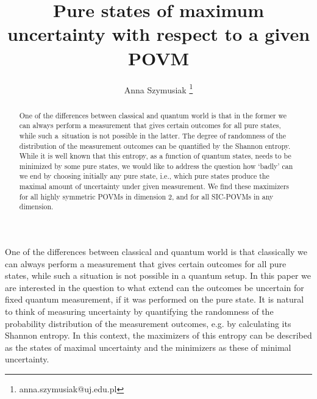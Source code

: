 \documentclass[11pt]{article}
\theoremstyle{remark}
\theoremstyle{definition}
\begin{document}
\title{Pure states of maximum uncertainty with respect to a given POVM}
\author[1]{Anna Szymusiak \thanks{anna.szymusiak@uj.edu.pl}}
\date{}

\maketitle
\begin{abstract}
One of the differences between classical and quantum world is that in the former we can always perform a measurement that gives certain outcomes for all pure states, while such a~situation is not possible in the latter. The degree of randomness of the distribution of the measurement outcomes can be quantified by the Shannon entropy. While it is well known that this entropy, as a function of quantum states, needs to be minimized by some pure states, we would like to address the question how `badly' can we end by choosing initially any pure state, i.e., which pure states produce the maximal amount of uncertainty under given measurement. We find these maximizers for all highly symmetric POVMs in dimension 2, and for all SIC-POVMs in any dimension. 
\end{abstract}



One of the differences between classical and quantum world is that classically we can always perform a measurement that gives certain outcomes for all pure states, while such a situation is not possible in a quantum setup. In this paper we are interested in the question to what extend can the outcomes be uncertain for fixed quantum measurement, if it was performed on the pure state. It is natural to think of measuring uncertainty by quantifying the randomness of the probability distribution of the measurement outcomes, e.g. by calculating its Shannon entropy. In this context, the maximizers of this entropy can be described as the states of maximal uncertainty and the minimizers as these of minimal uncertainty. 
\end{document}
